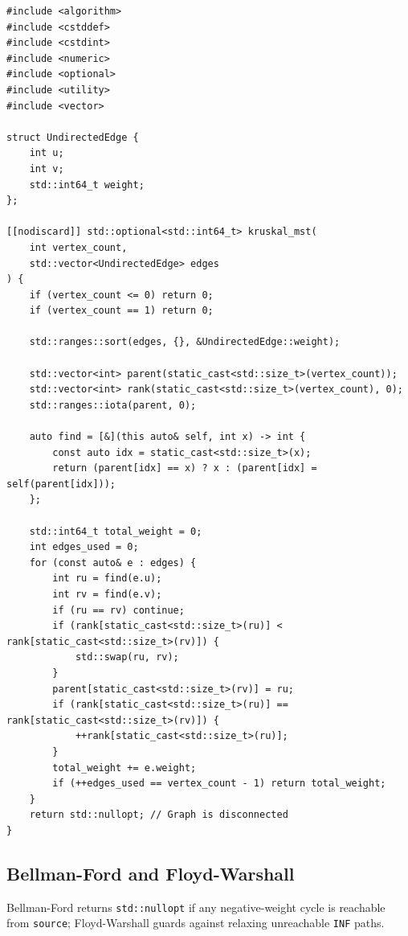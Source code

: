 \documentclass[11pt,a4paper]{article}
\theoremstyle{definition}
\begin{document}
\begin{lstlisting}[caption={Kruskal's Minimum Spanning Tree using std::ranges::sort and DSU}]
#include <algorithm>
#include <cstddef>
#include <cstdint>
#include <numeric>
#include <optional>
#include <utility>
#include <vector>

struct UndirectedEdge {
    int u;
    int v;
    std::int64_t weight;
};

[[nodiscard]] std::optional<std::int64_t> kruskal_mst(
    int vertex_count,
    std::vector<UndirectedEdge> edges
) {
    if (vertex_count <= 0) return 0;
    if (vertex_count == 1) return 0;

    std::ranges::sort(edges, {}, &UndirectedEdge::weight);

    std::vector<int> parent(static_cast<std::size_t>(vertex_count));
    std::vector<int> rank(static_cast<std::size_t>(vertex_count), 0);
    std::ranges::iota(parent, 0);

    auto find = [&](this auto& self, int x) -> int {
        const auto idx = static_cast<std::size_t>(x);
        return (parent[idx] == x) ? x : (parent[idx] = self(parent[idx]));
    };

    std::int64_t total_weight = 0;
    int edges_used = 0;
    for (const auto& e : edges) {
        int ru = find(e.u);
        int rv = find(e.v);
        if (ru == rv) continue;
        if (rank[static_cast<std::size_t>(ru)] < rank[static_cast<std::size_t>(rv)]) {
            std::swap(ru, rv);
        }
        parent[static_cast<std::size_t>(rv)] = ru;
        if (rank[static_cast<std::size_t>(ru)] == rank[static_cast<std::size_t>(rv)]) {
            ++rank[static_cast<std::size_t>(ru)];
        }
        total_weight += e.weight;
        if (++edges_used == vertex_count - 1) return total_weight;
    }
    return std::nullopt; // Graph is disconnected
}
\end{lstlisting}

\subsection{Bellman-Ford and Floyd-Warshall}
Bellman-Ford returns \texttt{std::nullopt} if any negative-weight cycle is reachable from \texttt{source}; Floyd-Warshall guards against relaxing unreachable \texttt{INF} paths.
\end{document}
